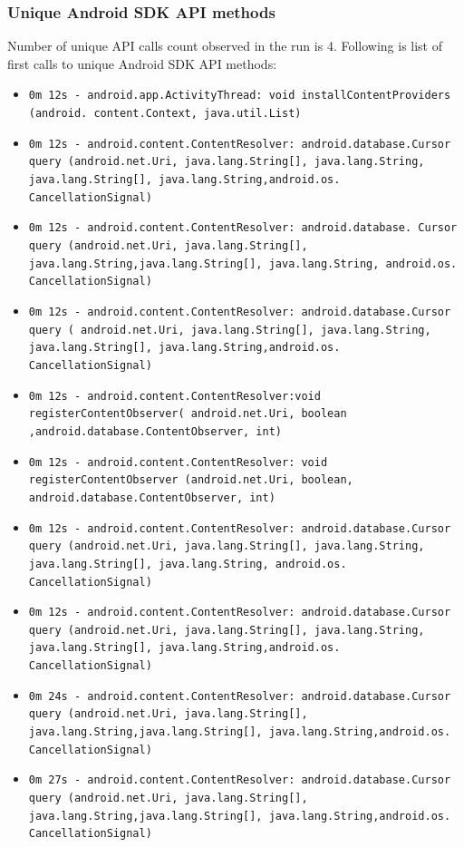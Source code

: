 \subsubsection{Unique Android SDK API methods}
Number of unique API calls count observed in the run is 4. Following is list of first calls to unique Android SDK API methods:
\begin{itemize}
    \item \texttt{0m 12s  - android.app.ActivityThread: void installContentProviders (android. content.Context, java.util.List)}
  \item \texttt{0m 12s  -  android.content.ContentResolver: android.database.Cursor query (android.net.Uri, java.lang.String[], java.lang.String, java.lang.String[], java.lang.String,android.os. CancellationSignal)}
 \item  \texttt{0m 12s  -  android.content.ContentResolver: android.database. Cursor query (android.net.Uri, java.lang.String[], java.lang.String,java.lang.String[],  java.lang.String, android.os. CancellationSignal)}
\item   \texttt{0m 12s  -  android.content.ContentResolver: android.database.Cursor query ( android.net.Uri, java.lang.String[], java.lang.String, java.lang.String[], java.lang.String,android.os. CancellationSignal)}
\item   \texttt{0m 12s  -  android.content.ContentResolver:void registerContentObserver( android.net.Uri, boolean ,android.database.ContentObserver, int)}
\item   \texttt{0m 12s -  android.content.ContentResolver: void registerContentObserver (android.net.Uri, boolean, android.database.ContentObserver, int)}
  \item \texttt{0m 12s  -  android.content.ContentResolver: android.database.Cursor query (android.net.Uri, java.lang.String[], java.lang.String, java.lang.String[], java.lang.String, android.os. CancellationSignal)}
 \item  \texttt{0m 12s  -  android.content.ContentResolver: android.database.Cursor query (android.net.Uri, java.lang.String[], java.lang.String, java.lang.String[],  java.lang.String,android.os. CancellationSignal)}
 \item  \texttt{0m 24s  -  android.content.ContentResolver: android.database.Cursor query (android.net.Uri, java.lang.String[], java.lang.String,java.lang.String[],  java.lang.String,android.os. CancellationSignal)}
 \item  \texttt{0m 27s  -  android.content.ContentResolver: android.database.Cursor query (android.net.Uri, java.lang.String[], java.lang.String,java.lang.String[], java.lang.String,android.os. CancellationSignal)}

\end{itemize}
